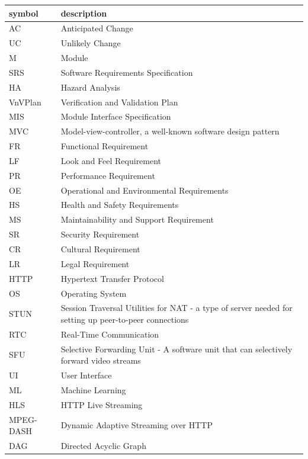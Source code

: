 \documentclass[12pt, titlepage]{article}
\begin{document}
\renewcommand{\arraystretch}{1.2}
\begin{tabular}{l l} 
  \toprule		
  \textbf{symbol} & \textbf{description}\\
  \midrule 
  AC & Anticipated Change\\
  UC & Unlikely Change \\
  M & Module \\
  SRS & Software Requirements Specification \\
  HA & Hazard Analysis \\
  VnVPlan & Verification and Validation Plan\\
  MIS & Module Interface Specification\\
  MVC & Model-view-controller, a well-known software design pattern \\
  FR & Functional Requirement \\
  LF & Look and Feel Requirement \\
  PR & Performance Requirement \\
  OE & Operational and Environmental Requirements \\
  HS & Health and Safety Requirements \\
  MS & Maintainability and Support Requirement \\
  SR & Security Requirement \\
  CR & Cultural Requirement \\
  LR & Legal Requirement\\
  HTTP & Hypertext Transfer Protocol \\
  OS &  Operating System\\
  STUN & Session Traversal Utilities for NAT - a type of server needed for setting up peer-to-peer connections \\
  RTC & Real-Time Communication  \\
  SFU & Selective Forwarding Unit - A software unit that can selectively forward video streams \\
  UI &  User Interface\\
  ML &  Machine Learning\\
  HLS &  HTTP Live Streaming\\
  MPEG-DASH &  Dynamic Adaptive Streaming over HTTP\\
  DAG &  Directed Acyclic Graph\\
  \bottomrule
\end{tabular}\\

\newpage
\end{document}
